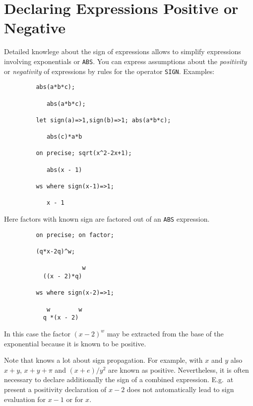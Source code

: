 \section{Declaring Expressions Positive or Negative}

Detailed knowlege about the sign of expressions allows {\REDUCE}
to simplify expressions involving exponentials or \texttt{ABS}.
You can express assumptions about the 
\emph{positivity} or \emph{negativity}
of expressions by rules for the operator \texttt{SIGN}.
Examples:
\begin{verbatim}
         abs(a*b*c);
      
            abs(a*b*c);

         let sign(a)=>1,sign(b)=>1; abs(a*b*c);

            abs(c)*a*b

         on precise; sqrt(x^2-2x+1);

            abs(x - 1)

         ws where sign(x-1)=>1;

            x - 1
\end{verbatim}
Here factors with known sign are factored out of an \texttt{ABS} expression.
\begin{verbatim}
         on precise; on factor; 

         (q*x-2q)^w;

                      w
           ((x - 2)*q)

         ws where sign(x-2)=>1;

            w        w
           q *(x - 2)

\end{verbatim}
       
In this case the factor $(x-2)^w$ may be extracted from the base
of the exponential because it is known to be positive.

Note that {\REDUCE} knows a lot about sign propagation.
For example, with $x$ and $y$ also $x+y$, $x+y+\pi$ and $(x+e)/y^2$
are known as positive.
Nevertheless, it is often necessary to declare additionally the sign of a 
combined expression. E.g.\ at present a positivity declaration of $x-2$ does not 
automatically lead to sign evaluation for $x-1$ or for $x$.

